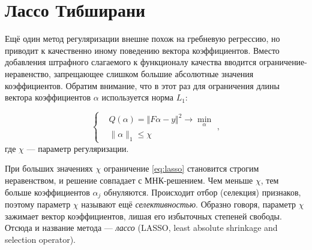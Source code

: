\documentclass[11pt,a4paper]{article}
\begin{document}
    \hypertarget{ux43bux430ux441ux441ux43e-ux442ux438ux431ux448ux438ux440ux430ux43dux438}{%
\section{Лассо
Тибширани}\label{ux43bux430ux441ux441ux43e-ux442ux438ux431ux448ux438ux440ux430ux43dux438}}

Ещё один метод регуляризации внешне похож на гребневую регрессию, но
приводит к качественно иному поведению вектора коэффициентов. Вместо
добавления штрафного слагаемого к функционалу качества вводится
ограничение-неравенство, запрещающее слишком большие абсолютные значения
коэффициентов. Обратим внимание, что в этот раз для ограничения длины
вектора коэффициентов \(\alpha\) используется норма \(L_1\):

\[
\left\{
\begin{aligned}
    & Q(\alpha) = \Vert F\alpha - y \Vert^2 \to \min_\alpha \\
    & \|\alpha\|_1 \le \chi
\end{aligned}
\right.,
\label{eq:lasso}\tag{5}
\] где \(\chi\) --- параметр регуляризации.

При больших значениях \(\chi\) ограничение \eqref{eq:lasso} становится строгим неравенством, и решение совпадает с МНК-решением.
Чем меньше \(\chi\), тем больше коэффициентов \(\alpha_j\) обнуляются.
Происходит отбор (селекция) признаков, поэтому параметр \(\chi\) называют ещё \emph{селективностью}.
Образно говоря, параметр \(\chi\) зажимает вектор коэффициентов, лишая его избыточных степеней свободы.
Отсюда и название метода --- \emph{лассо} (LASSO, least absolute shrinkage and selection
operator).
\end{document}
